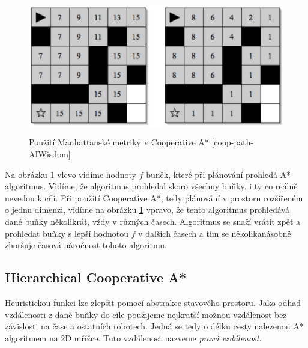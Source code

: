 \begin{figure}[htb]
	\begin{center}
		\includegraphics*[width=15cm,height=6cm,keepaspectratio]{obr/coopManh}
	\end{center}
	\caption[caption]{Použití Manhattanské metriky v Cooperative A* [coop-path-AIWisdom]}
	\label{obr:coopManh}
\end{figure}

Na obrázku \ref{obr:coopManh} vlevo vidíme hodnoty $f$ buněk, které při plánování prohledá A* algoritmus. Vidíme, že algoritmus prohledal skoro všechny buňky, i ty co reálně nevedou k cíli. Při použití Cooperative A*, tedy plánování v prostoru rozšířeném o jednu dimenzi, vidíme na obrázku \ref{obr:coopManh} vpravo, že tento algoritmus prohledává dané buňky několikrát, vždy v různých časech. Algoritmus se snaží vrátit zpět a prohledat buňky s lepší hodnotou $f$ v dalších časech a tím se několikanásobně zhoršuje časová náročnost tohoto algoritmu.

\subsection{Hierarchical Cooperative A*}


Heuristickou funkci lze zlepšit pomocí abstrakce stavového prostoru.  Jako odhad vzdálenosti z dané buňky do cíle použijeme nejkratší možnou vzdálenost bez závislosti na čase a ostatních robotech. Jedná se tedy o délku cesty nalezenou A* algoritmem na 2D mřížce. Tuto vzdálenost nazveme \emph{pravá vzdálenost}.

